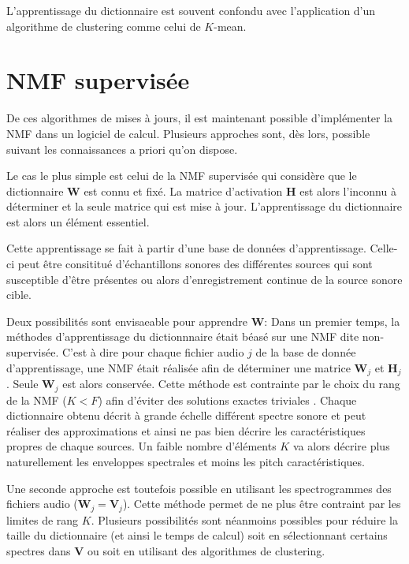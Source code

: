 L'apprentissage du dictionnaire est souvent confondu avec l'application d'un algorithme de clustering comme celui de $K$-mean.




\section{NMF supervisée}\label{NMF_sup}

De ces algorithmes de mises à jours, il est maintenant possible d'implémenter la NMF dans un logiciel de calcul. Plusieurs approches sont, dès lors, possible suivant les connaissances a priori qu'on dispose. 

Le cas le plus simple est celui de la NMF supervisée qui considère que le dictionnaire $\mathbf{W}$ est connu et fixé. La matrice d'activation $\mathbf{H}$ est alors l'inconnu à déterminer et la seule matrice qui est mise à jour. L'apprentissage du dictionnaire est alors un élément essentiel.

Cette apprentissage se fait à partir d'une base de données d'apprentissage. Celle-ci peut être consititué d'échantillons sonores des différentes sources qui sont susceptible d'être présentes ou alors d'enregistrement continue de la source sonore cible. 

Deux possibilités sont envisaeable pour apprendre $\mathbf{W}$: 
Dans un premier temps, la méthodes d'apprentissage du dictionnnaire était béasé sur une NMF dite non-supervisée. C'est à dire pour chaque fichier audio $j$ de la base de donnée d'apprentissage, une NMF était réalisée afin de déterminer une matrice $\mathbf{W}_j$ et $\mathbf{H}_j$. Seule $\mathbf{W}_j$ est alors conservée. Cette méthode est contrainte par le choix du rang de la NMF ($K < F$) afin d'éviter des solutions exactes triviales \cite{}. Chaque dictionnaire obtenu décrit à grande échelle différent spectre sonore et peut réaliser des approximations et ainsi ne pas bien décrire les caractéristiques propres de chaque sources. 
Un faible nombre d'éléments $K$ va alors décrire plus naturellement les enveloppes spectrales et moins les pitch caractéristiques.


Une seconde approche est toutefois possible en utilisant les spectrogrammes des fichiers audio ($\mathbf{W}_j = \mathbf{V}_j$). Cette méthode permet de ne plus être contraint par les limites de rang $K$. Plusieurs possibilités sont néanmoins possibles pour réduire la taille du dictionnaire (et ainsi le temps de calcul) soit en sélectionnant certains spectres dans $\mathbf{V}$ ou soit en utilisant des algorithmes de clustering. 

